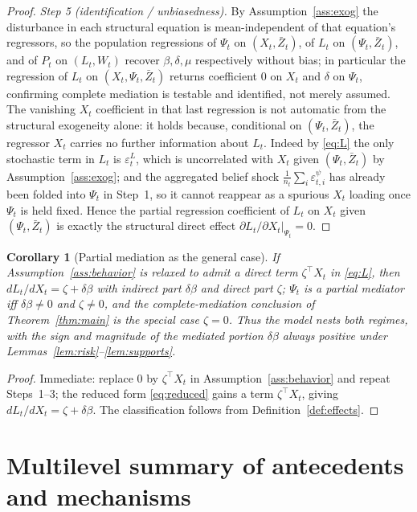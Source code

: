 \documentclass{amsart}
\newtheorem{corollary}{Corollary}
\theoremstyle{definition}
\theoremstyle{remark}
\begin{document}
\begin{proof}
\emph{Step 5 (identification / unbiasedness).}
By Assumption~\ref{ass:exog} the disturbance in each structural equation is
mean-independent of that equation's regressors, so the population
regressions of $\Psi_t$ on $(X_t,\bar Z_t)$, of $L_t$ on
$(\Psi_t,\bar Z_t)$, and of $P_t$ on $(L_t,W_t)$ recover
$\beta,\delta,\mu$ respectively without bias; in particular the regression
of $L_t$ on $(X_t,\Psi_t,\bar Z_t)$ returns coefficient $0$ on $X_t$ and
$\delta$ on $\Psi_t$, confirming complete mediation is testable and
identified, not merely assumed. The vanishing $X_t$ coefficient in that
last regression is not automatic from the structural exogeneity alone: it
holds because, conditional on $(\Psi_t,\bar Z_t)$, the regressor $X_t$
carries no further information about $L_t$. Indeed by \eqref{eq:L} the only
stochastic term in $L_t$ is $\varepsilon^L_t$, which is uncorrelated with
$X_t$ given $(\Psi_t,\bar Z_t)$ by Assumption~\ref{ass:exog}; and the
aggregated belief shock $\tfrac1{n_t}\sum_i\varepsilon^\psi_{t,i}$ has
already been folded into $\Psi_t$ in Step~1, so it cannot reappear as a
spurious $X_t$ loading once $\Psi_t$ is held fixed. Hence the partial
regression coefficient of $L_t$ on $X_t$ given $(\Psi_t,\bar Z_t)$ is
exactly the structural direct effect $\partial L_t/\partial X_t|_{\Psi_t}=0$.
\end{proof}

\begin{corollary}[Partial mediation as the general case]\label{cor:partial}
If Assumption~\ref{ass:behavior} is relaxed to admit a direct term
$\zeta^\top X_t$ in \eqref{eq:L}, then
$dL_t/dX_t=\zeta+\delta\beta$ with indirect part $\delta\beta$ and direct
part $\zeta$; $\Psi_t$ is a \emph{partial} mediator iff $\delta\beta\neq0$
and $\zeta\neq0$, and the complete-mediation conclusion of
Theorem~\ref{thm:main} is the special case $\zeta=0$. Thus the model
nests both regimes, with the sign and magnitude of the mediated portion
$\delta\beta$ always positive under
Lemmas~\ref{lem:risk}--\ref{lem:supports}.
\end{corollary}

\begin{proof}
Immediate: replace $0$ by $\zeta^\top X_t$ in
Assumption~\ref{ass:behavior} and repeat Steps~1--3; the reduced form
\eqref{eq:reduced} gains a term $\zeta^\top X_t$, giving
$dL_t/dX_t=\zeta+\delta\beta$. The classification follows from
Definition~\ref{def:effects}.
\end{proof}

\section{Multilevel summary of antecedents and mechanisms}
\end{document}
